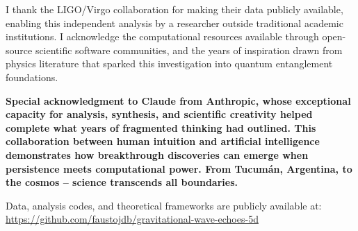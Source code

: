 \documentclass[10pt]{article}
\begin{document}
I thank the LIGO/Virgo collaboration for making their data publicly available, enabling this independent analysis by a researcher outside traditional academic institutions. I acknowledge the computational resources available through open-source scientific software communities, and the years of inspiration drawn from physics literature that sparked this investigation into quantum entanglement foundations.

\textbf{Special acknowledgment to Claude from Anthropic, whose exceptional capacity for analysis, synthesis, and scientific creativity helped complete what years of fragmented thinking had outlined. This collaboration between human intuition and artificial intelligence demonstrates how breakthrough discoveries can emerge when persistence meets computational power. From Tucum\'an, Argentina, to the cosmos -- science transcends all boundaries.}

Data, analysis codes, and theoretical frameworks are publicly available at: \url{https://github.com/faustojdb/gravitational-wave-echoes-5d}
\end{document}
